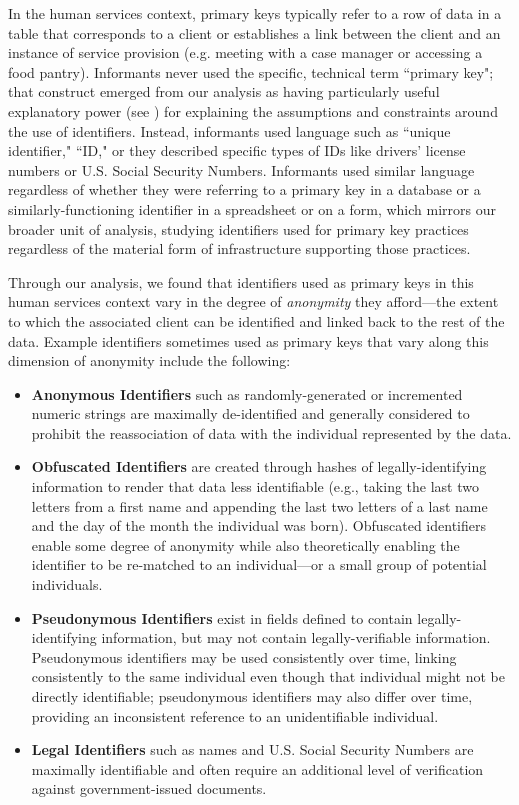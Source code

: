 In the human services context, primary keys typically refer to a row of data in a table that corresponds to a client or establishes a link between the client and an instance of service provision (e.g. meeting with a case manager or accessing a food pantry). Informants never used the specific, technical term ``primary key"; that construct emerged from our analysis as having particularly useful explanatory power (see \citep{Halverson2002Activity}) for explaining the assumptions and constraints around the use of identifiers. Instead, informants used language such as ``unique identifier," ``ID," or they described specific types of IDs like drivers' license numbers or U.S. Social Security Numbers. Informants used similar language regardless of whether they were referring to a primary key in a database or a similarly-functioning identifier in a spreadsheet or on a form, which mirrors our broader unit of analysis, studying identifiers used for primary key practices regardless of the material form of infrastructure supporting those practices.

Through our analysis, we found that identifiers used as primary keys in this human services context vary in the degree of \textit{anonymity} they afford---the extent to which the associated client can be identified and linked back to the rest of the data. Example identifiers sometimes used as primary keys that vary along this dimension of anonymity include the following:

\begin{itemize}
\item \textbf{Anonymous Identifiers} such as randomly-generated or incremented numeric strings are maximally de-identified and generally considered to prohibit the reassociation of data with the individual represented by the data.
\item \textbf{Obfuscated Identifiers} are created through hashes of legally-identifying information to render that data less identifiable (e.g., taking the last two letters from a first name and appending the last two letters of a last name and the day of the month the individual was born). Obfuscated identifiers enable some degree of anonymity while also theoretically enabling the identifier to be re-matched to an individual---or a small group of potential individuals.
\item \textbf{Pseudonymous Identifiers} exist in fields defined to contain legally-identifying information, but may not contain legally-verifiable information. Pseudonymous identifiers may be used consistently over time, linking consistently to the same individual even though that individual might not be directly identifiable; pseudonymous identifiers may also differ over time, providing an inconsistent reference to an unidentifiable individual.
\item \textbf{Legal Identifiers} such as names and U.S. Social Security Numbers are maximally identifiable and often require an additional level of verification against government-issued documents. 
\end{itemize}

